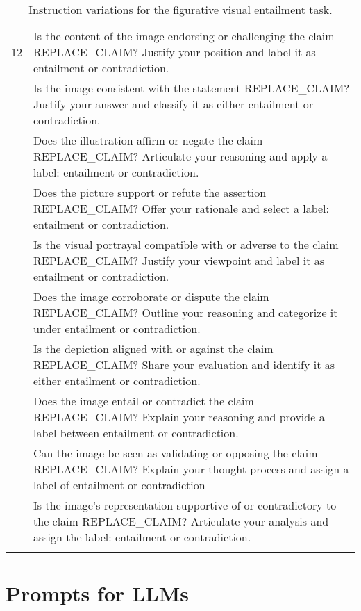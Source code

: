 \begin{table*}[htbp]
\begin{adjustbox}{width=1.8\columnwidth, center}
\begin{tabular}{@{}lp{}@{}}
12 & Is the content of the image endorsing or challenging the claim REPLACE\_CLAIM? Justify your position and label it as entailment or contradiction. \\\addlinespace
13 & Is the image consistent with the statement REPLACE\_CLAIM? Justify your answer and classify it as either entailment or contradiction. \\\addlinespace
14 & Does the illustration affirm or negate the claim REPLACE\_CLAIM? Articulate your reasoning and apply a label: entailment or contradiction. \\\addlinespace
15 & Does the picture support or refute the assertion REPLACE\_CLAIM? Offer your rationale and select a label: entailment or contradiction. \\\addlinespace
16 & Is the visual portrayal compatible with or adverse to the claim REPLACE\_CLAIM? Justify your viewpoint and label it as entailment or contradiction. \\\addlinespace
17 & Does the image corroborate or dispute the claim REPLACE\_CLAIM? Outline your reasoning and categorize it under entailment or contradiction. \\\addlinespace
18 & Is the depiction aligned with or against the claim REPLACE\_CLAIM? Share your evaluation and identify it as either entailment or contradiction. \\\addlinespace
19 & Does the image entail or contradict the claim REPLACE\_CLAIM? Explain your reasoning and provide a label between entailment or contradiction. \\\addlinespace
20 & Can the image be seen as validating or opposing the claim REPLACE\_CLAIM? Explain your thought process and assign a label of entailment or contradiction \\\addlinespace
21 & Is the image’s representation supportive of or contradictory to the claim REPLACE\_CLAIM? Articulate your analysis and assign the label: entailment or contradiction. \\\addlinespace
\bottomrule
\end{tabular}
\end{adjustbox}
\caption{Instruction variations for the figurative visual entailment task.}
\label{tab:instructs}
\end{table*}



\section{Prompts for LLMs} \label{app:prompts}

